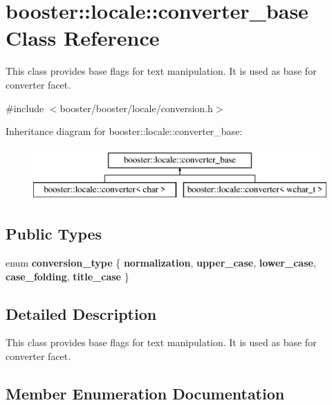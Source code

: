 \section{booster\-:\-:locale\-:\-:converter\-\_\-base \-Class \-Reference}
\label{classbooster_1_1locale_1_1converter__base}


\-This class provides base flags for text manipulation. \-It is used as base for converter facet.  




{\ttfamily \#include $<$booster/booster/locale/conversion.\-h$>$}

\-Inheritance diagram for booster\-:\-:locale\-:\-:converter\-\_\-base\-:\begin{figure}[H]
\begin{center}
\leavevmode
\includegraphics[height=2.000000cm]{classbooster_1_1locale_1_1converter__base}
\end{center}
\end{figure}
\subsection*{\-Public \-Types}
\begin{DoxyCompactItemize}
\item 
enum {\bf conversion\-\_\-type} \{ \*
{\bf normalization}, 
{\bf upper\-\_\-case}, 
{\bf lower\-\_\-case}, 
{\bf case\-\_\-folding}, 
\*
{\bf title\-\_\-case}
 \}
\end{DoxyCompactItemize}


\subsection{\-Detailed \-Description}
\-This class provides base flags for text manipulation. \-It is used as base for converter facet. 

\subsection{\-Member \-Enumeration \-Documentation}
